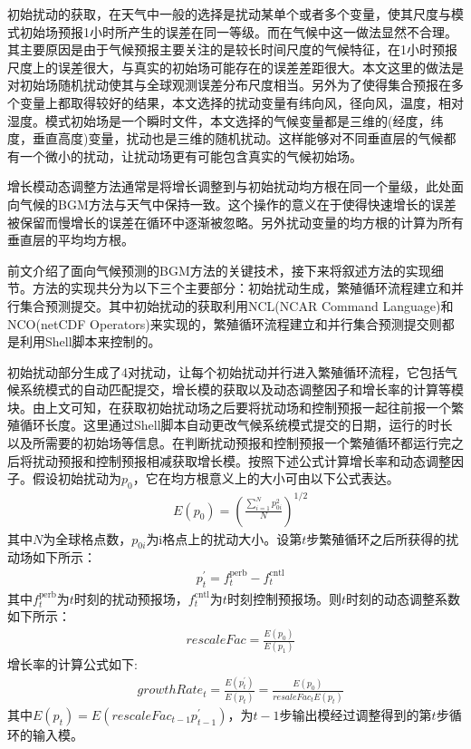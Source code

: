初始扰动的获取，在天气中一般的选择是扰动某单个或者多个变量，使其尺度与模式初始场预报1小时所产生的误差在同一等级。而在气候中这一做法显然不合理。其主要原因是由于气候预报主要关注的是较长时间尺度的气候特征，在1小时预报尺度上的误差很大，与真实的初始场可能存在的误差差距很大。本文这里的做法是对初始场随机扰动使其与全球观测误差分布尺度相当。另外为了使得集合预报在多个变量上都取得较好的结果，本文选择的扰动变量有纬向风，径向风，温度，相对湿度。模式初始场是一个瞬时文件，本文选择的气候变量都是三维的(经度，纬度，垂直高度)变量，扰动也是三维的随机扰动。这样能够对不同垂直层的气候都有一个微小的扰动，让扰动场更有可能包含真实的气候初始场。

增长模动态调整方法通常是将增长调整到与初始扰动均方根在同一个量级，此处面向气候的BGM方法与天气中保持一致。这个操作的意义在于使得快速增长的误差被保留而慢增长的误差在循环中逐渐被忽略。另外扰动变量的均方根的计算为所有垂直层的平均均方根。

前文介绍了面向气候预测的BGM方法的关键技术，接下来将叙述方法的实现细节。方法的实现共分为以下三个主要部分：初始扰动生成，繁殖循环流程建立和并行集合预测提交。其中初始扰动的获取利用NCL(NCAR Command Language)和NCO(netCDF Operators)来实现的，繁殖循环流程建立和并行集合预测提交则都是利用Shell脚本来控制的。

初始扰动部分生成了4对扰动，让每个初始扰动并行进入繁殖循环流程，它包括气候系统模式的自动匹配提交，增长模的获取以及动态调整因子和增长率的计算等模块。由上文可知，在获取初始扰动场之后要将扰动场和控制预报一起往前报一个繁殖循环长度。这里通过Shell脚本自动更改气候系统模式提交的日期，运行的时长以及所需要的初始场等信息。在判断扰动预报和控制预报一个繁殖循环都运行完之后将扰动预报和控制预报相减获取增长模。按照下述公式计算增长率和动态调整因子。假设初始扰动为$p_0$，它在均方根意义上的大小可由以下公式表达。
\begin{align}
&  { E } \left( p _ { 0 } \right) = ({\frac{ \sum _ { i = 1 } ^ { N } p _ { 0 i } ^ { 2 }}{N}})^ { 1 / 2 } 
\end{align}
其中$N$为全球格点数，$p_{0i}$为i格点上的扰动大小。设第$t$步繁殖循环之后所获得的扰动场如下所示：
\begin{align}
& p _ { t } ^ { \prime } = f _ { t } ^ { \mathrm { perb } } - f _ { t } ^ { \mathrm { cntl } } 
\end{align}
其中$f _ { t } ^ { \mathrm { perb } }$为$t$时刻的扰动预报场，$f _ { t } ^ { \mathrm { cntl } }$为$t$时刻控制预报场。则$t$时刻的动态调整系数如下所示：
\begin{align}
& { rescaleFac } = \frac { E \left( p _ { 0 } \right) } { E \left( p _ { 1 } \right) } 
\end{align}
增长率的计算公式如下:
\begin{align}
& growthRate _ { t } = \frac { E \left( p _ { t } ^ { \prime } \right) } { E \left( p _ { t } \right) } = \frac { E \left( p _ { 0 } \right) } { resaleFac _ { t } E \left( p _ { t } \right) } 
\end{align}
其中$E \left( p _ { t } \right) = E \left( rescaleFac _ { t - 1 } p _ { t - 1 } ^ { \prime } \right)$，为$t-1$步输出模经过调整得到的第$t$步循环的输入模。

